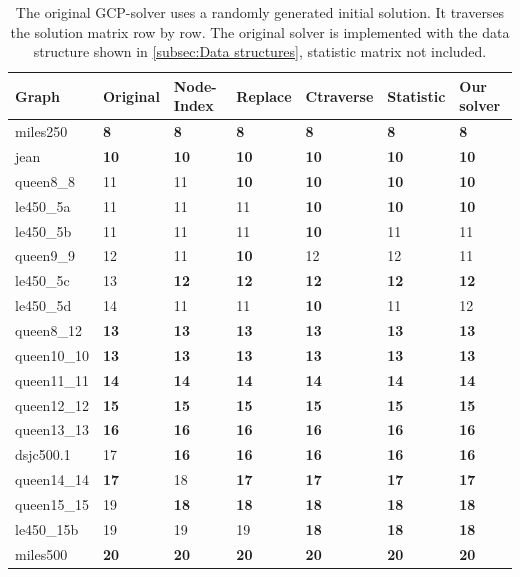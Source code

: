 \documentclass[12pt,a4paper,twoside]{scrartcl}
\numberwithin{equation}{section}
\begin{document}
\begin{landscape}
\begin{table}[]
\label{tab:com}
\caption{
The original GCP-solver uses a randomly generated initial solution. It traverses the solution matrix row by row. The original solver is implemented with the data structure shown in \ref{subsec:Data structures}, statistic matrix not included.}
\footnotesize
    \begin{tabular}[t]{|p{2.2cm}|p{1.4cm} p{1.4cm}p{1.2cm} p{1.2cm} p{1cm} p{1.2cm}|}
\hline
Graph&Original&Node-Index&Replace&Ctraverse&Statistic&Our solver\\ \hline
miles250&\textbf{8}&\textbf{8}&\textbf{8}&\textbf{8}&\textbf{8}&\textbf{8}\\ 
jean&\textbf{10}&\textbf{10}&\textbf{10}&\textbf{10}&\textbf{10}&\textbf{10}\\
queen8\_8&11&11&\textbf{10}&\textbf{10}&\textbf{10}&\textbf{10}\\
le450\_5a&11&11&11&\textbf{10}&\textbf{10}&\textbf{10}\\ 
le450\_5b&11&11&11&\textbf{10}&11&11\\ \hline
queen9\_9&12&11&\textbf{10}&12&12&11\\ 
le450\_5c&13&\textbf{12}&\textbf{12}&\textbf{12}&\textbf{12}&\textbf{12}\\ 
le450\_5d&14&11&11&\textbf{10}&11&12\\ 
queen8\_12&\textbf{13}&\textbf{13}&\textbf{13}&\textbf{13}&\textbf{13}&\textbf{13}\\
queen10\_10&\textbf{13}&\textbf{13}&\textbf{13}&\textbf{13}&\textbf{13}&\textbf{13}\\ \hline
queen11\_11&\textbf{14}&\textbf{14}&\textbf{14}&\textbf{14}&\textbf{14}&\textbf{14}\\
queen12\_12&\textbf{15}&\textbf{15}&\textbf{15}&\textbf{15}&\textbf{15}&\textbf{15}\\
queen13\_13&\textbf{16}&\textbf{16}&\textbf{16}&\textbf{16}&\textbf{16}&\textbf{16}\\ 
dsjc500.1&17&\textbf{16}&\textbf{16}&\textbf{16}&\textbf{16}&\textbf{16}\\
queen14\_14&\textbf{17}&18&\textbf{17}&\textbf{17}&\textbf{17}&\textbf{17}\\ \hline
queen15\_15&19&\textbf{18}&\textbf{18}&\textbf{18}&\textbf{18}&\textbf{18}\\ 
le450\_15b&19&19&19&\textbf{18}&\textbf{18}&\textbf{18}\\
miles500&\textbf{20}&\textbf{20}&\textbf{20}&\textbf{20}&\textbf{20}&\textbf{20}\\

\end{tabular}
\end{table}
\end{landscape}
\end{document}
